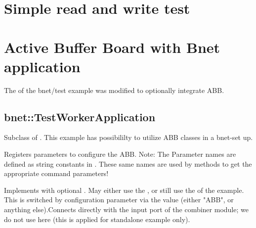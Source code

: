 

\section{Simple read and write test}


\section{Active Buffer Board with Bnet application}
The  of the bnet/test example was modified to optionally integrate ABB.

\subsection{bnet::TestWorkerApplication}
Subclass of . This example has possibililty to utilize ABB classes in a bnet-set up.

\begin{compactenum} 

\item Registers parameters to configure the ABB. Note: The Parameter names are defined as string constants in . These same names are used by  methods to get the appropriate command parameters!
\item Implements  with optional . May either use the , or still use the  of the example. This is switched by configuration parameter via the  value (either "ABB", or anything else).Connects  directly with the input port of the combiner module; we do not use  here (this is applied for standalone example  only).

\end{compactenum} 
